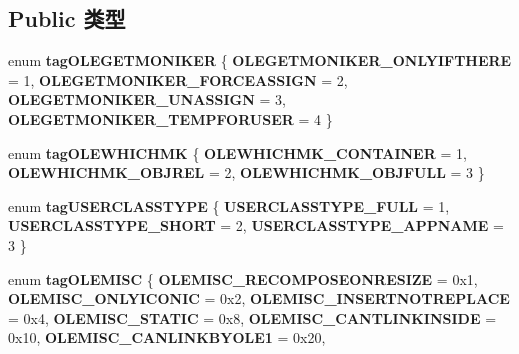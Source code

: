 \subsection*{Public 类型}
\begin{DoxyCompactItemize}
\item 
\mbox{\label{interface_i_ole_object_afeb55e133e1d575a387bc3e3e8f82793}} 
enum {\bfseries tag\+O\+L\+E\+G\+E\+T\+M\+O\+N\+I\+K\+ER} \{ {\bfseries O\+L\+E\+G\+E\+T\+M\+O\+N\+I\+K\+E\+R\+\_\+\+O\+N\+L\+Y\+I\+F\+T\+H\+E\+RE} = 1, 
{\bfseries O\+L\+E\+G\+E\+T\+M\+O\+N\+I\+K\+E\+R\+\_\+\+F\+O\+R\+C\+E\+A\+S\+S\+I\+GN} = 2, 
{\bfseries O\+L\+E\+G\+E\+T\+M\+O\+N\+I\+K\+E\+R\+\_\+\+U\+N\+A\+S\+S\+I\+GN} = 3, 
{\bfseries O\+L\+E\+G\+E\+T\+M\+O\+N\+I\+K\+E\+R\+\_\+\+T\+E\+M\+P\+F\+O\+R\+U\+S\+ER} = 4
 \}
\item 
\mbox{\label{interface_i_ole_object_a5a9e73a72434009902e9ba3c7d6a6c1e}} 
enum {\bfseries tag\+O\+L\+E\+W\+H\+I\+C\+H\+MK} \{ {\bfseries O\+L\+E\+W\+H\+I\+C\+H\+M\+K\+\_\+\+C\+O\+N\+T\+A\+I\+N\+ER} = 1, 
{\bfseries O\+L\+E\+W\+H\+I\+C\+H\+M\+K\+\_\+\+O\+B\+J\+R\+EL} = 2, 
{\bfseries O\+L\+E\+W\+H\+I\+C\+H\+M\+K\+\_\+\+O\+B\+J\+F\+U\+LL} = 3
 \}
\item 
\mbox{\label{interface_i_ole_object_aa1ce1d52d8859e473b331c65b0213065}} 
enum {\bfseries tag\+U\+S\+E\+R\+C\+L\+A\+S\+S\+T\+Y\+PE} \{ {\bfseries U\+S\+E\+R\+C\+L\+A\+S\+S\+T\+Y\+P\+E\+\_\+\+F\+U\+LL} = 1, 
{\bfseries U\+S\+E\+R\+C\+L\+A\+S\+S\+T\+Y\+P\+E\+\_\+\+S\+H\+O\+RT} = 2, 
{\bfseries U\+S\+E\+R\+C\+L\+A\+S\+S\+T\+Y\+P\+E\+\_\+\+A\+P\+P\+N\+A\+ME} = 3
 \}
\item 
\mbox{\label{interface_i_ole_object_a6884eaccf4f1d65aea0e988a923d57d5}} 
enum {\bfseries tag\+O\+L\+E\+M\+I\+SC} \{ \newline
{\bfseries O\+L\+E\+M\+I\+S\+C\+\_\+\+R\+E\+C\+O\+M\+P\+O\+S\+E\+O\+N\+R\+E\+S\+I\+ZE} = 0x1, 
{\bfseries O\+L\+E\+M\+I\+S\+C\+\_\+\+O\+N\+L\+Y\+I\+C\+O\+N\+IC} = 0x2, 
{\bfseries O\+L\+E\+M\+I\+S\+C\+\_\+\+I\+N\+S\+E\+R\+T\+N\+O\+T\+R\+E\+P\+L\+A\+CE} = 0x4, 
{\bfseries O\+L\+E\+M\+I\+S\+C\+\_\+\+S\+T\+A\+T\+IC} = 0x8, 
\newline
{\bfseries O\+L\+E\+M\+I\+S\+C\+\_\+\+C\+A\+N\+T\+L\+I\+N\+K\+I\+N\+S\+I\+DE} = 0x10, 
{\bfseries O\+L\+E\+M\+I\+S\+C\+\_\+\+C\+A\+N\+L\+I\+N\+K\+B\+Y\+O\+L\+E1} = 0x20, 

\end{DoxyCompactItemize}
